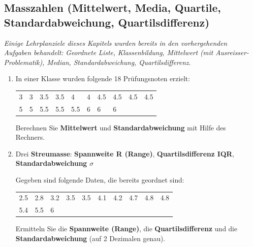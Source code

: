 \subsection{Masszahlen (Mittelwert, Media, Quartile,
  Standardabweichung, Quartilsdifferenz)}

\textit{Einige Lehrplanziele dieses Kapitels wurden bereits in den
  vorhergehenden Aufgaben behandelt: Geordnete Liste, Klassenbildung,
  Mittelwert (mit Ausreisser-Problematik), Median, Standardabweichung,
  Quartilsdifferenz.}

\begin{enumerate}
\item In einer Klasse wurden folgende 18 Prüfungsnoten erzielt:

  \begin{tabular}{llllllllll}
    3 & 3 & 3.5 & 3.5 & 4   & 4 & 4.5 & 4.5 & 4.5 & 4.5\\
    5 & 5 & 5.5 & 5.5 & 5.5 & 6 & 6   & 6
  \end{tabular}

  Berechnen Sie \textbf{Mittelwert} und \textbf{Standardabweichung}
  mit Hilfe des Rechners.

\item Drei \textbf{Streumasse}: \textbf{Spannweite R (Range)},
  \textbf{Quartilsdifferenz IQR}, \textbf{Standardabweichung $\sigma$}

  Gegeben sind folgende Daten, die bereits geordnet sind:

  \begin{tabular}{llllllllll}
    2.5 & 2.8 & 3.2 & 3.5 & 3.5 & 4.1 & 4.2 & 4.7 & 4.8 & 4.8\\
    5.4 & 5.5 & 6
  \end{tabular}

  Ermitteln Sie die \textbf{Spannweite (Range)}, die
  \textbf{Quartilsdifferenz} und die \textbf{Standardabweichung} (auf
  2 Dezimalen genau).
  
  
  \end{enumerate}


\newpage
